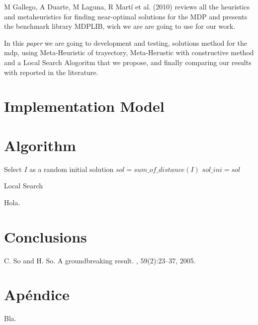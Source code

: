 \documentclass{ci5652}
\begin{document}
M Gallego, A Duarte, M Laguna, R Martí et al.  (2010) reviews all the heuristics and metaheuristics for finding near-optimal solutions for the MDP and presents the benchmark library MDPLIB, wich we are are going to use for our work.

In this \textit{paper}  we are going to development and testing, solutions method for the mdp, using Meta-Heuristic of trayectory, Meta-Herustic with constructive method and a Local Search Alogoritm that we propose, and finally comparing our results with reported in the literature.


\section{Implementation Model}

\section{Algorithm}

\begin{algorithm}
 \DontPrintSemicolon
 \vspace*{0.1cm}
 Select {$I$} as a random initial solution\;
 {$ sol = sum\_of\_distance(I) $}\;
 {$ sol\_ini = sol $}\;
 \vspace*{0.1cm}
 \caption{Local Search}
\end{algorithm}

Hola.

\section*{Conclusions}



\small


\begin{thebibliography}{99}

C. So and H. So.
\newblock A groundbreaking result.
, 59(2):23--37, 2005.


\end{thebibliography}


\newpage
\section*{Apéndice}

Bla.
\end{document}
